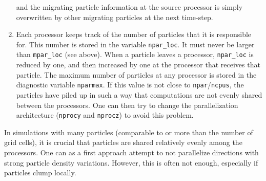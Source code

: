 \documentclass[\mydriver,12pt,twoside,notitlepage,a4paper]{article}
\newcommand{\code}[1]{\texttt{#1}}
\begin{document}
\begin{enumerate}
  and the migrating particle information at the source processor is simply
  overwritten by other migrating particles at the next time-step.
  \item Each processor keeps track of the number of particles that it is
  responsible for. This number is stored in the variable \code{npar_loc}.  It
  must never be larger than \code{mpar_loc} (see above). When a particle
  leaves a processor, \code{npar_loc} is reduced by one, and then increased by
  one at the processor that receives that particle. The maximum number of
  particles at any processor is stored in the diagnostic variable
  \code{nparmax}. If this value is not close to \code{npar}/\code{ncpus}, the
  particles have piled up in such a way that computations are not evenly shared
  between the processors. One can then try to change the parallelization
  architecture (\code{nprocy} and \code{nprocz}) to avoid this problem.
\end{enumerate}

In simulations with many particles (comparable to or more than the number of
grid cells), it is crucial that particles are shared relatively evenly among
the processors. One can as a first approach attempt to not parallelize
directions with strong particle density variations. However, this is often not
enough, especially if particles clump locally.
\end{document}
